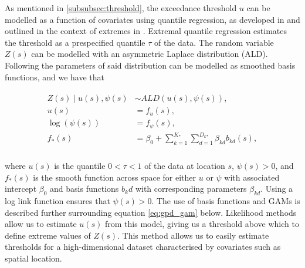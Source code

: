 \documentclass{article}
\numberwithin{equation}{section}
\begin{document}
As mentioned in \ref{subsubsec:threshold}, the exceedance threshold $u$ can be modelled as a function of covariates using quantile regression, as developed in \citet{Yu2001} and outlined in the context of extremes in \citet{Youngman2019}.
Extremal quantile regression estimates the threshold as a prespecified quantile $\tau$ of the data. 
The random variable $Z(s)$ can be modelled with an asymmetric Laplace distribution (ALD).
Following \citet{Youngman2019} the parameters of said distribution can be modelled as smoothed basis functions, and we have that
\begin{center}
  \begin{align} \label{eq:asymmetric_laplace}
    \begin{split}
      Z(s) \mid u(s), \psi(s) &\sim ALD(u(s), \psi(s)), \\
      u(s) &= f_u(s), \\
      \log(\psi(s)) &= f_{\psi}(s), \\
      f_*(s) &= \beta_0 + \sum_{k = 1}^{K_*}{\sum_{d = 1}^{D_k{_*}}\beta_{kd}b_{kd}(s)}, \\
    \end{split}
  \end{align}
\end{center}
where $u(s)$ is the quantile $0 < \tau < 1$ of the data at location $s$, $\psi(s) > 0$, and $f_*(s)$ is the smooth function across space for either $u$ or $\psi$ with associated intercept $\beta_0$ and basis functions $b_kd$ with corresponding parameters $\beta_{kd}$.
Using a log link function ensures that $\psi(s) > 0$.
The use of basis functions and GAMs is described further surrounding equation \ref{eq:gpd_gam} below. 
Likelihood methods allow us to estimate $u(s)$ from this model, giving us a threshold above which to define extreme values of $Z(s)$.
This method allows us to easily estimate thresholds for a high-dimensional dataset characterised by covariates such as spatial location.
\end{document}
